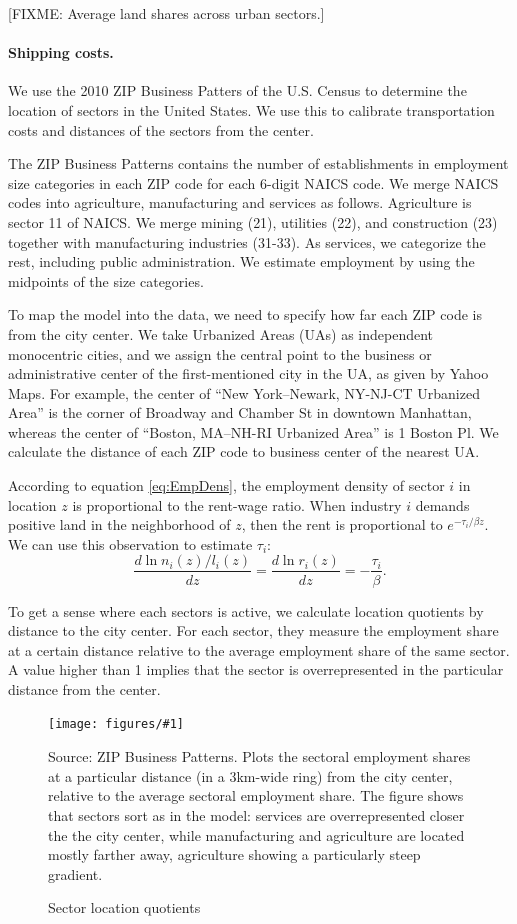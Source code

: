 \documentclass[12pt]{article}
\newcommand{\dofigure}[3]{\begin{figure}
\begin{centering}
\texttt{[image: figures/\#1]}
  \caption{#2\label{fig:#1}}
\end{centering}

\noindent \footnotesize{#3}
\end{figure}}
\begin{document}
[FIXME: Average land shares across urban sectors.]

\paragraph{Shipping costs.}
We use the 2010 ZIP Business Patters of the U.S. Census \cite{CBP} to determine the location of sectors in the United States. We use this to calibrate transportation costs and distances of the sectors from the center.

The ZIP Business Patterns contains the number of establishments in employment size categories in each ZIP code for each 6-digit NAICS code. We merge NAICS codes into agriculture, manufacturing and services as follows. Agriculture is sector 11 of NAICS. We merge mining (21), utilities (22), and construction (23) together with manufacturing industries (31-33). As services, we categorize the rest, including public administration. We estimate employment by using the midpoints of the size categories.

To map the model into the data, we need to specify how far each ZIP code is from the city center. We take Urbanized Areas (UAs) as independent monocentric cities, and we assign the central point to the business or administrative center of the first-mentioned city in the UA, as given by Yahoo Maps. For example, the center of ``New York–Newark, NY-NJ-CT Urbanized Area'' is the corner of Broadway and Chamber St in downtown Manhattan, whereas the center of ``Boston, MA–NH-RI Urbanized Area'' is 1 Boston Pl. We calculate the distance of each ZIP code to business center of the nearest UA.

According to equation \ref{eq:EmpDens}, the employment density of sector $i$ in location $z$ is proportional to the rent-wage ratio. When industry $i$ demands positive land in the neighborhood of $z$, then the rent is proportional to $e^{-\tau_i/\beta z}$. We can use this observation to estimate $\tau_i$:
\[
\frac{d\ln n_i(z)/l_i(z)}{dz} =\frac{d\ln r_i(z)}{dz} = -\frac{\tau_i}{\beta}.
\]

To get a sense where each sectors is active, we calculate location quotients by distance to the city center. For each sector, they measure the employment share at a certain distance relative to the average employment share of the same sector. A value higher than 1 implies that the sector is overrepresented in the particular distance from the center.

\dofigure{sector_location_quotients}{Sector location quotients}{Source: ZIP Business Patterns. Plots the sectoral employment shares at a particular distance (in a 3km-wide ring) from the city center, relative to the average sectoral employment share. The figure shows that sectors sort as in the model: services are overrepresented closer the the city center, while manufacturing and agriculture are located mostly farther away, agriculture showing a particularly steep gradient.}
\end{document}
